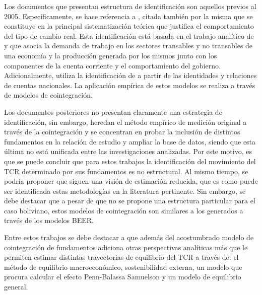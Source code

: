 \documentclass[12pt,letterpaper]{article}
\begin{document}
Los documentos que presentan estructura de identificación son aquellos previos al 2005. Específicamente, se hace referencia a \cite{lora2000tipo}, citada también por \cite{marquez2003estimacion} la misma que se constituye en la principal sistematización teórica que justifica el comportamiento del tipo de cambio real. Esta identificación está basada en el trabajo analítico de \cite{baffes1999red} y \cite{hinkle1999exchange} que asocia la demanda de trabajo en los sectores transables y no transables de una economía y la producción generada por los mismos junto con los componentes de la cuenta corriente y el comportamiento del gobierno. Adicionalmente, \cite{humerez2005reexaminando} utiliza la identificación de \cite{elbadawi1994estimating} a partir de las identidades y relaciones de cuentas nacionales. La aplicación empírica de estos modelos se realiza a través de modelos de cointegración.

Los documentos posteriores no presentan claramente una estrategia de identificación, sin embargo, heredan el método empírico de medición original a través de la cointegración y se concentran en probar la inclusión de distintos fundamentos en la relación de estudio y ampliar la base de datos, siendo que esta última no está unificada entre las investigaciones analizadas. Por este motivo, es que se puede concluir que para estos trabajos la identificación del movimiento del TCR determinado por sus fundamentos es no estructural. Al mismo tiempo, se podría proponer que siguen una visión de estimación reducida, que es como puede ser identificada estas metodologías en la literatura pertinente. Sin embargo, se debe destacar que a pesar de que no se propone una estructura particular para el caso boliviano, estos modelos de cointegración son similares a los generados a través de los modelos BEER.

Entre estos trabajos se debe destacar a \cite{cerezo2011tipo} que además del acostumbrado modelo de cointegración de fundamentos adiciona otras perspectivas analíticas más que le permiten estimar distintas trayectorias de equilibrio del TCR a través de: el método de equilibrio macroeconómico, sostenibilidad externa, un modelo que procura calcular el efecto Penn-Balassa Samuelson y un modelo de equilibrio general.
\end{document}
